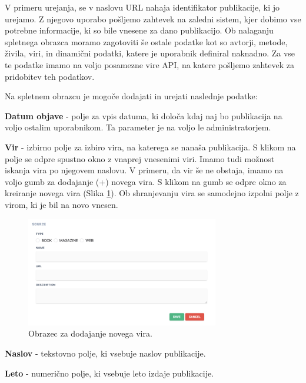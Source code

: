 \documentclass[a4paper, 12pt]{book}
\begin{document}
V primeru urejanja, se v naslovu URL nahaja identifikator publikacije, ki jo urejamo. Z njegovo uporabo pošljemo zahtevek na zaledni sistem, kjer dobimo vse potrebne informacije, ki so bile vnesene za dano publikacijo. Ob nalaganju spletnega obrazca moramo zagotoviti še ostale podatke kot so avtorji, metode, živila, viri, in dinamični podatki, katere je uporabnik definiral naknadno. Za vse te podatke imamo na voljo posamezne vire API, na katere pošljemo zahtevek za pridobitev teh podatkov.

\clearpage
Na spletnem obrazcu je mogoče dodajati in urejati naslednje podatke:

\begin{description}
\item \textbf{Datum objave} - polje za vpis datuma, ki določa kdaj naj bo publikacija na voljo ostalim uporabnikom. Ta parameter je na voljo le administratorjem.

\item \textbf{Vir} - izbirno polje za izbiro vira, na katerega se nanaša publikacija. S klikom na polje se odpre spustno okno z vnaprej vnesenimi viri. Imamo tudi možnost iskanja vira po njegovem naslovu. V primeru, da vir še ne obstaja, imamo na voljo gumb za dodajanje (+) novega vira. S klikom na gumb se odpre okno za kreiranje novega vira (Slika \ref{add-source}). Ob shranjevanju vira se samodejno izpolni polje z virom, ki je bil na novo vnesen.

\begin{figure}[h]
\begin{center}
\includegraphics[width=0.75\textwidth]{slike/add-source.png}
\end{center}
\caption{ Obrazec za dodajanje novega vira. }
\label{add-source}
\end{figure}

\item \textbf{Naslov} - tekstovno polje, ki vsebuje naslov publikacije.

\item \textbf{Leto} - numerično polje, ki vsebuje leto izdaje publikacije.


\end{description}
\end{document}
